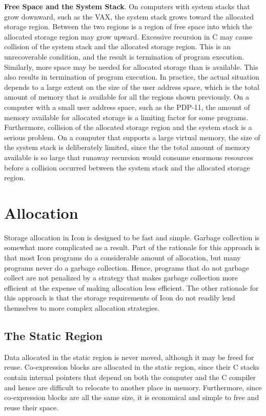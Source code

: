 \textbf{Free Space and the System Stack}. On computers with system
stacks that grow downward, such as the VAX, the system stack grows
toward the allocated storage region. Between the two regions is a
region of free space into which the allocated storage region may grow
upward. Excessive recursion in C may cause collision of the system
stack and the allocated storage region. This is an unrecoverable
condition, and the result is termination of program execution.
Similarly, more space may be needed for allocated storage than is
available. This also results in termination of program execution. In
practice, the actual situation depends to a large extent on the size
of the user address space, which is the total amount of memory that is
available for all the regions shown previously. On a computer with a
small user address space, such as the PDP-11, the amount of memory
available for allocated storage is a limiting factor for some
programs. Furthermore, collision of the allocated storage region and
the system stack is a serious problem. On a computer that supports a
large virtual memory, the size of the system stack is deliberately
limited, since the the total amount of memory available is so large
that runaway recursion would consume enormous resources before a
collision occurred between the system stack and the allocated storage
region.

\section{Allocation}

Storage allocation in Icon is designed to be fast and simple. Garbage
collection is somewhat more complicated as a result. Part of the
rationale for this approach is that most Icon programs do a
considerable amount of allocation, but many programs never do a
garbage collection. Hence, programs that do not garbage collect are
not penalized by a strategy that makes garbage collection more
efficient at the expense of making allocation less efficient. The
other rationale for this approach is that the storage requirements of
Icon do not readily lend themselves to more complex allocation
strategies.

\subsection{The Static Region}

Data allocated in the static region is never moved, although it may be
freed for reuse. Co-expression blocks are allocated in the static
region, since their C stacks contain internal pointers that depend on
both the computer and the C compiler and hence are difficult to
relocate to another place in memory. Furthermore, since co-expression
blocks are all the same size, it is economical and simple to free and
reuse their space.


